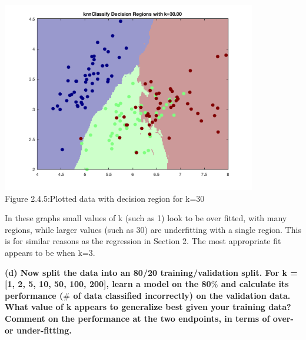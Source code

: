 \documentclass[]{scrreprt}   %
\begin{document}
\begin{center}
\includegraphics[width=30em,keepaspectratio]{p4figure5.png}\\
{Figure 2.4.5:Plotted data with decision region for k=30}
\end{center} 
\bigbreak
{In these graphs small values of k (such as 1) look to be over fitted, with many regions, while larger values (such as 30) are underfitting with a single region. This is for similar reasons as the regression in Section 2. The most appropriate fit appears to be when k=3. }

\bigbreak

\textbf{(d) Now split the data into an 80/20 training/validation split. For k = [1, 2, 5, 10, 50, 100, 200], learn a model on the 80$\%$ and calculate its performance ($\#$ of data classified incorrectly) on the validation data. What value of k appears to generalize best given your training data? Comment on the performance at the two endpoints, in terms of over- or under-fitting.}
\end{document}
